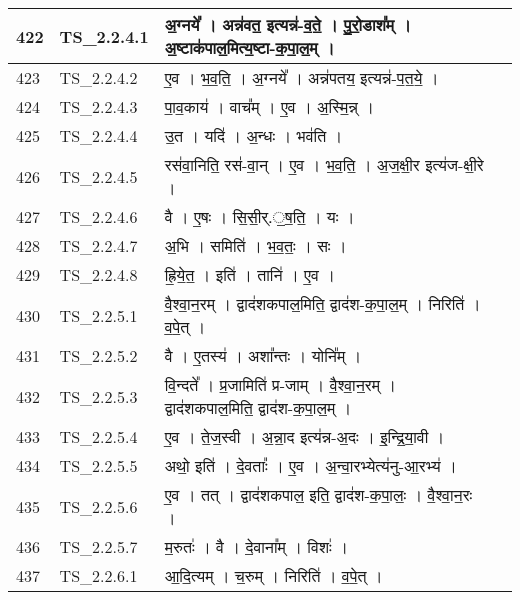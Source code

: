 \documentclass[17pt]{extarticle}
\begin{document}
\begin{longtable}{||p{0.4in}||p{0.9in}||p{4.0in}||p{0.9in}||}
        \hline
            422 & TS\_2.2.4.1 & अ॒ग्नये᳚   ।   अन्न॑वत॒ इत्यन्न॑{-}व॒ते॒   ।   पु॒रो॒डाश᳚म्   ।   अ॒ष्टाक॑पाल॒मित्य॒ष्टा{-}क॒पा॒ल॒म्   ।    &      \\
        \hline
            423 & TS\_2.2.4.2 & ए॒व   ।   भ॒व॒ति॒   ।   अ॒ग्नये᳚   ।   अन्न॑पतय॒ इत्यन्न॑{-}प॒त॒ये॒   ।    &      \\
        \hline
            424 & TS\_2.2.4.3 & पा॒व॒काय॑   ।   वाच᳚म्   ।   ए॒व   ।   अ॒स्मि॒न्न्   ।    &      \\
        \hline
            425 & TS\_2.2.4.4 & उ॒त   ।   यदि॑   ।   अ॒न्धः   ।   भव॑ति   ।    &      \\
        \hline
            426 & TS\_2.2.4.5 & रस॑वा॒निति॒ रस॑{-}वा॒न्   ।   ए॒व   ।   भ॒व॒ति॒   ।   अ॒ज॒क्षी॒र इत्य॑ज{-}क्षी॒रे   ।    &      \\
        \hline
            427 & TS\_2.2.4.6 & वै   ।   ए॒षः   ।   सि॒सी॒र्.॒ष॒ति॒   ।   यः   ।    &      \\
        \hline
            428 & TS\_2.2.4.7 & अ॒भि   ।   समिति॑   ।   भ॒व॒तः॒   ।   सः   ।    &      \\
        \hline
            429 & TS\_2.2.4.8 & ह्रि॒ये॒त॒   ।   इति॑   ।   तानि॑   ।   ए॒व   ।    &      \\
        \hline
            430 & TS\_2.2.5.1 & वै॒श्वा॒न॒रम्   ।   द्वाद॑शकपाल॒मिति॒ द्वाद॑श{-}क॒पा॒ल॒म्   ।   निरिति॑   ।   व॒पे॒त्   ।    &      \\
        \hline
            431 & TS\_2.2.5.2 & वै   ।   ए॒तस्य॑   ।   अशा᳚न्तः   ।   योनि᳚म्   ।    &      \\
        \hline
            432 & TS\_2.2.5.3 & वि॒न्दते᳚   ।   प्र॒जामिति॑ प्र{-}जाम्   ।   वै॒श्वा॒न॒रम्   ।   द्वाद॑शकपाल॒मिति॒ द्वाद॑श{-}क॒पा॒ल॒म्   ।    &      \\
        \hline
            433 & TS\_2.2.5.4 & ए॒व   ।   ते॒ज॒स्वी   ।   अ॒न्ना॒द इत्य॑न्न{-}अ॒दः   ।   इ॒न्द्रि॒या॒वी   ।    &      \\
        \hline
            434 & TS\_2.2.5.5 & अथो॒ इति॑   ।   दे॒वताः᳚   ।   ए॒व   ।   अ॒न्वा॒रभ्येत्य॑नु{-}आ॒रभ्य॑   ।    &      \\
        \hline
            435 & TS\_2.2.5.6 & ए॒व   ।   तत्   ।   द्वाद॑शकपाल॒ इति॒ द्वाद॑श{-}क॒पा॒लः॒   ।   वै॒श्वा॒न॒रः   ।    &      \\
        \hline
            436 & TS\_2.2.5.7 & म॒रुतः॑   ।   वै   ।   दे॒वाना᳚म्   ।   विशः॑   ।    &      \\
        \hline
            437 & TS\_2.2.6.1 & आ॒दि॒त्यम्   ।   च॒रुम्   ।   निरिति॑   ।   व॒पे॒त्   ।    &      \\

\end{longtable}
\end{document}
